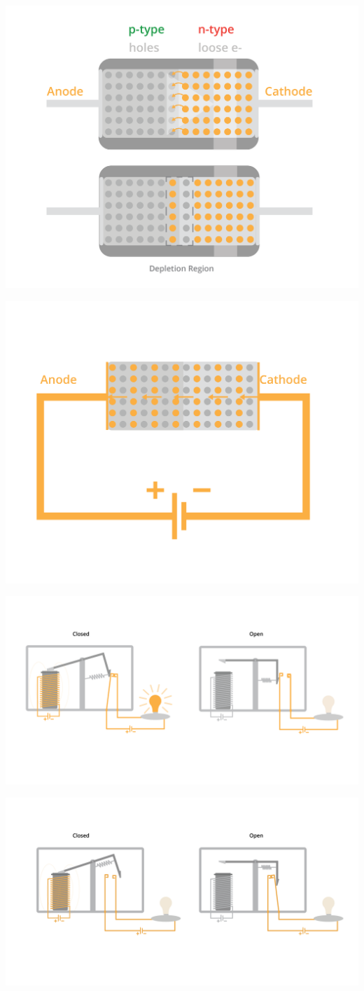\documentclass{article}
\begin{document}
\includegraphics[width=.75\textwidth]{diodeProcess-31.png}

\includegraphics[width=.75\textwidth]{diodeProcess-32.png}


\includegraphics[width=.75\textwidth]{relayFull.png}

\includegraphics[width=.75\textwidth]{relayFull2.png}
\end{document}

